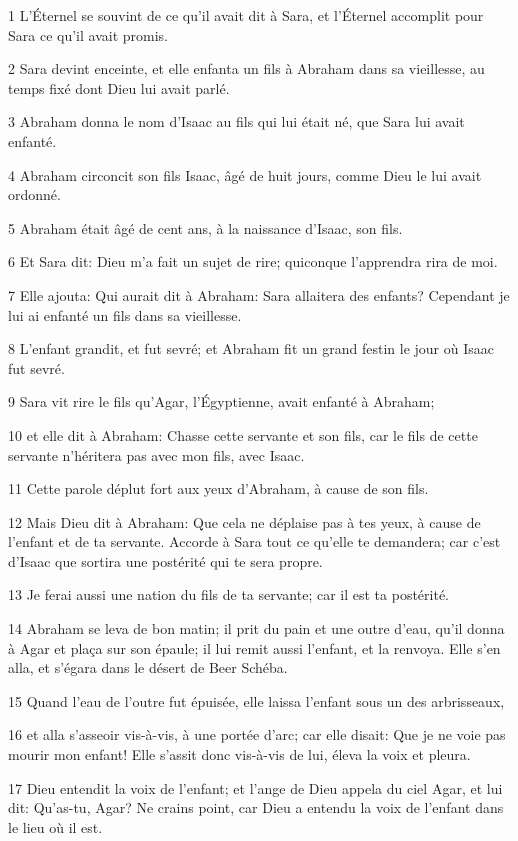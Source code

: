 \par 1 L'Éternel se souvint de ce qu'il avait dit à Sara, et l'Éternel accomplit pour Sara ce qu'il avait promis.
\par 2 Sara devint enceinte, et elle enfanta un fils à Abraham dans sa vieillesse, au temps fixé dont Dieu lui avait parlé.
\par 3 Abraham donna le nom d'Isaac au fils qui lui était né, que Sara lui avait enfanté.
\par 4 Abraham circoncit son fils Isaac, âgé de huit jours, comme Dieu le lui avait ordonné.
\par 5 Abraham était âgé de cent ans, à la naissance d'Isaac, son fils.
\par 6 Et Sara dit: Dieu m'a fait un sujet de rire; quiconque l'apprendra rira de moi.
\par 7 Elle ajouta: Qui aurait dit à Abraham: Sara allaitera des enfants? Cependant je lui ai enfanté un fils dans sa vieillesse.
\par 8 L'enfant grandit, et fut sevré; et Abraham fit un grand festin le jour où Isaac fut sevré.
\par 9 Sara vit rire le fils qu'Agar, l'Égyptienne, avait enfanté à Abraham;
\par 10 et elle dit à Abraham: Chasse cette servante et son fils, car le fils de cette servante n'héritera pas avec mon fils, avec Isaac.
\par 11 Cette parole déplut fort aux yeux d'Abraham, à cause de son fils.
\par 12 Mais Dieu dit à Abraham: Que cela ne déplaise pas à tes yeux, à cause de l'enfant et de ta servante. Accorde à Sara tout ce qu'elle te demandera; car c'est d'Isaac que sortira une postérité qui te sera propre.
\par 13 Je ferai aussi une nation du fils de ta servante; car il est ta postérité.
\par 14 Abraham se leva de bon matin; il prit du pain et une outre d'eau, qu'il donna à Agar et plaça sur son épaule; il lui remit aussi l'enfant, et la renvoya. Elle s'en alla, et s'égara dans le désert de Beer Schéba.
\par 15 Quand l'eau de l'outre fut épuisée, elle laissa l'enfant sous un des arbrisseaux,
\par 16 et alla s'asseoir vis-à-vis, à une portée d'arc; car elle disait: Que je ne voie pas mourir mon enfant! Elle s'assit donc vis-à-vis de lui, éleva la voix et pleura.
\par 17 Dieu entendit la voix de l'enfant; et l'ange de Dieu appela du ciel Agar, et lui dit: Qu'as-tu, Agar? Ne crains point, car Dieu a entendu la voix de l'enfant dans le lieu où il est.
